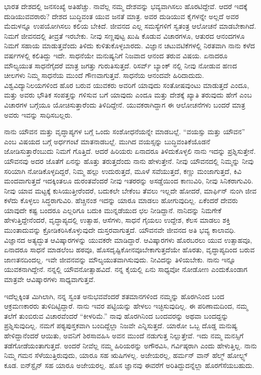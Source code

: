ಭಾರತ ದೇಶದಲ್ಲಿ ಜನಸಂಖ್ಯೆ ಅತಿಹೆಚ್ಚು. ನಾವೆಲ್ಲ ನಮ್ಮ ದೇಶವನ್ನು ಭವ್ಯವಾಗಿಸಲು ಹೊರಟಿದ್ದೇವೆ. ಆದರೆ ಇದಕ್ಕೆ ದುಡಿಯುವವರಾರು? ದೇಶದ ಬುದ್ಧಿವಂತ ಯುವ ಜನತೆ ಮಾತ್ರ. ಅವರ ದುಡಿಯುವ ಕೈಗಳನ್ನೇ ಅಲ್ಲದೆ ಅವರ ಮೆದುಳನ್ನೂ ಉಪಯೋಗಿಸಲು ಕಲಿಯ ಬೇಕಿದೆ. ಜೀವನದ ಎಲ್ಲ ಸಮಸ್ಯೆಗಳಿಗೆ ಸ್ವತಂತ್ರ ಆಲೋಚನೆ ಮಾಡಬೇಕಾಗಿದೆ. ನಿಮಗೆ ಜೀವನದಲ್ಲಿ ತೀವ್ರತೆ ಇರಬೇಕು. ನೀವು ಸಣ್ಣಪುಟ್ಟ ಖುಷಿ ಕೊಡುವ ವಿಚಾರಗಳೂ, ಆತುರದ ಆನಂದಗಳೂ ನಿಮಗೆ ಸಹಾಯ ಮಾಡುತ್ತವೆಂದು ತಿಳಿದು ಕುಳಿತುಕೊಳ್ಳಬಾರದು. ವಿಜ್ಞಾನ ಚಟುವಟಿಕೆಗಳಲ್ಲಿ ನಿರತವಾಗಿ ನಾನು ಕಳೆದ  ವರ್ಷಗಳಲ್ಲಿ ಕಲಿತಿದ್ದು ಇದೇ. ಸಾಧನೆಯೇ ಮನುಷ್ಯನಿಗೆ ನಿಜವಾದ ಆನಂದ ತರುವ ವಿಷಯ. ಏನಾದರೂ ಮೌಲ್ಯಯುತ ಸಾಧನೆಗೈದರೆ ಮಾತ್ರ ಜಗತ್ತು ಗುರುತಿಸುತ್ತದೆ. ರಿಸರ್ವ್ ಬ್ಯಾಂಕ್ ನಲ್ಲಿ ನೀವು ನೋಡುವ ಹಣದ ಚೀಲಗಳು ನಿಮ್ಮ ಸಾಧನೆಯ ಮುಂದೆ ಗೌಣವಾಗುತ್ತವೆ. ಸಾಧನೆಯ ಆನಂದವೇ ಹಿರಿದಾದುದು. ವಿಶ್ವವಿದ್ಯಾನಿಲಯಗಳಿಂದ ಹೊರ ಬರುವ ಯುವಕರು ಅವರಿಗೆ ಯಾವುದು ಸಂತೋಷವುಂಟು ಮಾಡುತ್ತದೆ ಎಂದೂ, ಮತ್ತು ಅವರು ಭೌತಿಕ ಸಂಪತ್ತನ್ನು ಗಳಿಸುವ ಬಗೆ ಯಾವುದು ಎಂದೂ ಮತ್ತು ದೇಶಕ್ಕೆ ಖ್ಯಾತಿ ತರುವುದು ಹೇಗೆ ಎಂಬ ವಿಚಾರಗಳ ಬಗ್ಗೆಯೂ ಯೋಚಿಸುತ್ತಾರೆಂದು ತಿಳಿದಿದ್ದೇನೆ. ಯುವಕರಾಗಿದ್ದಾಗ ಈ ಆಲೋಚನೆಗಳು ಬಂದರೆ ಮಾತ್ರ ಅವರು ಇವನ್ನು ಸಾಧಿಸಬಲ್ಲರು.

ನಾನು ಯೌವನ ಮತ್ತು ವೃದ್ಧಾಪ್ಯಗಳ ಬಗ್ಗೆ ಒಂದು ಸಂಶೋಧನೆಯನ್ನೇ ಮಾಡಬಲ್ಲೆ. “ವಯಸ್ಸು ಮತ್ತು ಯೌವನ” ಎಂಬ ವಿಷಯದ ಬಗ್ಗೆ ಅರ್ಧಗಂಟೆ ಮಾತನಾಡಬಲ್ಲೆ. ಮುಗಿದ ವಯಸ್ಸನ್ನು ಬುದ್ಧಿವಂತಿಕೆಯೊಡನೆ ಜೋಡಿಸುತ್ತಾರೆಂಬುದು ನಿಮಗೆ ಗೊತ್ತಿದೆ. ಆದರೆ ಹಿರಿಯರು ಏನಾದರೂ ತಿಳಿದುಕೊಳ್ಳಲಿ ನಾನು ಇದನ್ನು ಪ್ರಶ್ನಿಸುತ್ತೇನೆ. ಯೌವನವು ಅದರ ಜೊತೆಗೆ ಏನನ್ನು ಹೊತ್ತು ತರುತ್ತದೆಂದು ನಾನು ಹೇಳುತ್ತೇನೆ. ನೀವು ಯೌವನದಲ್ಲಿ ನಿಮ್ಮನ್ನು ನೀವು ಸರಿಯಾಗಿ ನೋಡಿಕೊಳ್ಳದಿದ್ದರೆ, ನಿಮ್ಮ ಹಲ್ಲು ಉದುರುತ್ತದೆ, ಮೂಳೆ ಸವೆಯುತ್ತದೆ, ಕಣ್ಣು ಮಂಜಾಗುತ್ತದೆ, ಕಿವಿ ಮಂದವಾಗುತ್ತದೆ ಇದಕ್ಕಿಂತಲೂ ದುರಂತವೆಂದರೆ ನೀವು ಇತರರನ್ನು ಅಸಡ್ಡೆಯಿಂದ ಕಾಣುವಿರಿ, ನೀವು ಸಿನಿಕರಾಗುವಿರಿ. ನೀವು ಯಾವ ಮಟ್ಟಕ್ಕೆ ಕುಸಿಯುತ್ತೀರೆಂದರೆ, ಬದುಕಲೇ ಬೇಕೆಂಬ ತೆವಲು ಇಲ್ಲದೇ ಹೋದರೆ, ಮಾರ್ಫಿನ್ ನುಂಗಿ ಜೀವ ಕಳೆದು ಕೊಳ್ಳಲು ಸಿದ್ಧರಾಗುವಿರಿ. ಹೆಚ್ಚಿನಂಶ ಇದನ್ನು ಯಾರೂ ಮಾಡಲು ಹೋಗುವುದಿಲ್ಲ. ಏಕೆಂದರೆ ದೇವರು ಯಾವುದೇ ಕಷ್ಟ ಬಂದರೂ ಎಲ್ಲರಿಗೂ ಬದುಕಿ ಮುನ್ನಡೆಯುದ ಛಲ ನೀಡಿದ್ದಾನೆ. ನಾನಿದನ್ನು ನಿಮಗೇಕೆ ಹೇಳುತ್ತಿದ್ದೇನೆಂದರೆ, ವೃದ್ಧಾಪ್ಯದಲ್ಲಿ ಉತ್ಸಾಹ, ಆಸೆಗಳು, ಸಾಧನೆ ಗೈಯಲು ಉದ್ದೇಶ, ಕೆಲಸ ಮಾಡಲು ಶಕ್ತಿ ಮುಂತಾದುವನ್ನು ಕ್ರೋಡಿಕರಿಸಿಕೊಳ್ಳುವುದೇ ದುಸ್ತರವಾಗುತ್ತದೆ. ಯೌವನವೇ ಜೀವನದ ಅತಿ ಭವ್ಯ ಕಾಲಾವಧಿ. ವಿಜ್ಞಾನದ ಅತ್ಯದ್ಭುತ ಆವಿಷ್ಕಾರಗಳನ್ನು ಯುವಕರೇ ಮಾಡಿದ್ದಾರೆ. ಆವಿಷ್ಕಾರಗಳು ಹೊರಬರಲು ಯುವ ಉತ್ಸಾಹವೂ, ಏನಾದರೂ ಸಾಧನೆ ಮಾಡಲೆಂಬ ಹಠವೂ, ಹೊಸದೃಷ್ಟಿಕೋನವೂ\break ಬೇಕಾಗುತ್ತದೆಯೇ ಹೊರತು, ವೃದ್ಧಾಪ್ಯದಿಂದ ಬರುವ ಜಾಣತನದಿಂದಲ್ಲ. ಇವೇ ಜೀವನವನ್ನು ಮೌಲ್ಯಯುತವಾಗಿಸುವುದು. ನೀವಿದನ್ನು ತಿಳಿಯಬೇಕು. ನಾನು ಇನ್ನೂ ಯುವಕನಾಗಿದ್ದೇನೆ. ನನ್ನಲ್ಲಿ ಯೌವನೋತ್ಸಾಹವಿದೆ. ನನ್ನ ಕೈಯಲ್ಲಿ ಏನು ಸಾಧ್ಯವೋ ನೋಡೋಣ ಎಂದುಕೊಂಡಾಗ ಮಾತ್ರವೇ ಆವಿಷ್ಕಾರಗಳು ಸಾಧ್ಯವಾಗುತ್ತವೆ.



ಇದೆಲ್ಲಕ್ಕಿಂತ ಮಿಗಿಲಾಗಿ, ನನ್ನ ಸ್ವಂತ ಅನುಭವವೆಂದರೆ ಶತಮಾನಗಳಿಂದ ನಮ್ಮನ್ನು ಹೊರಗಿನಿಂದ ಬಂದ ಆಕ್ರಮಣಕಾರರು ತುಳಿದಿಟ್ಟಿದ್ದಾರೆ. ನಾನು ಇವರ ಪಟ್ಟಿಯನ್ನು ಹೇಳಲು ಇಚ್ಛಿಸುವುದಿಲ್ಲ. ಈ ಪರಿಣಾಮದಿಂದ, ನಮ್ಮ ತಲೆಗೆ ತುಂಬಿರುವ ವಿಚಾರವೆಂದರೆ “ಕೀಳರಿಮೆ.” ನಾವು ಹೊರಗಿನಿಂದ ಬಂದವರನ್ನು ಅಥವಾ ಬಂದದ್ದನ್ನು ಪ್ರಶ್ನಿಸುವುದಿಲ್ಲ. ನಮಗೆ ಪಠ್ಯಪುಸ್ತಕವಾಗಿ ಬಂದಿದ್ದೆಲ್ಲಾ ನಿಜವೇ ಎನ್ನಿಸುತ್ತದೆ. ಯಾರೋ ಒಬ್ಬ ದೊಡ್ಡ ಮನುಷ್ಯ ಹೇಳಿದ್ದಾನೆಂದರೆ ಆಯಿತು, ಅವನಿಗೆ ಶಿರಸಾವಹಿಸಿ ಅವನ ಮುಂದೆ ನಡುಗುತ್ತ ನಿಲ್ಲುತ್ತೇವೆ. ಇದು ನಮ್ಮ ಮನಸ್ಸಿಗೆ ತಡೆಗೋಡೆಯಂತಾಗುತ್ತದೆ. ಅಂದರೆ ನೀವೆಲ್ಲ ನಮ್ಮ ಹಿರಿಯರನ್ನು ಅಗೌರವಿಸಿ, ಗರ್ವಿಷ್ಠರಾಗಿ ಎಂದು ಹೇಳುತ್ತಿಲ್ಲ. ನಾನು ನಿಮ್ಮ ಗಮನ ಸೆಳೆಯುತ್ತಿರುವುದು, ಯಾರೂ ಸಹ ಋಷಿಗಳಲ್ಲ. ಅಜೇಯರಲ್ಲ, ಹರ್ಮನ್ ವಾನ್ ಹೆಲ್ಮ್ ‍ಹೋಲ್ಟ್ಸ್ ಕೂಡ. ಐನ್‍ಸ್ಟೈನ್ ಸಹ ಯಾರೂ ಅಜೇಯರಲ್ಲ. ಹೊಸ ಜ್ಞಾನವು ಈವರೆಗೆ ಅರಿತಿದ್ದುದನ್ನೆಲ್ಲಾ ಹೊರಗೆಸೆಯಬಹುದು.

